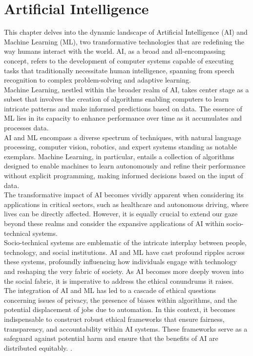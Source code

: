 \documentclass[12pt,a4paper,openright,twoside]{book}
\begin{document}
\section{Artificial Intelligence}
This chapter delves into the dynamic landscape of Artificial Intelligence (AI) and Machine Learning (ML), two transformative technologies that are redefining the way humans interact with the world. AI, as a broad and all-encompassing concept, refers to the development of computer systems capable of executing tasks that traditionally necessitate human intelligence, spanning from speech recognition to complex problem-solving and adaptive learning. \\
Machine Learning, nestled within the broader realm of AI, takes center stage as a subset that involves the creation of algorithms enabling computers to learn intricate patterns and make informed predictions based on data. The essence of ML lies in its capacity to enhance performance over time as it accumulates and processes data.  \\
AI and ML encompass a diverse spectrum of techniques, with natural language processing, computer vision, robotics, and expert systems standing as notable exemplars. Machine Learning, in particular, entails a collection of algorithms designed to enable machines to learn autonomously and refine their performance without explicit programming, making informed decisions based on the input of data. \\
The transformative impact of AI becomes vividly apparent when considering its applications in critical sectors, such as healthcare and autonomous driving, where lives can be directly affected. However, it is equally crucial to extend our gaze beyond these realms and consider the expansive applications of AI within socio-technical systems. \\
Socio-technical systems are emblematic of the intricate interplay between people, technology, and social institutions. AI and ML have cast profound ripples across these systems, profoundly influencing how individuals engage with technology and reshaping the very fabric of society. As AI becomes more deeply woven into the social fabric, it is imperative to address the ethical conundrums it raises. \\
The integration of AI and ML has led to a cascade of ethical questions concerning issues of privacy, the presence of biases within algorithms, and the potential displacement of jobs due to automation. In this context, it becomes indispensable to construct robust ethical frameworks that ensure fairness, transparency, and accountability within AI systems. These frameworks serve as a safeguard against potential harm and ensure that the benefits of AI are distributed equitably. \cite{GRUETZEMACHER202210288}.
\end{document}
